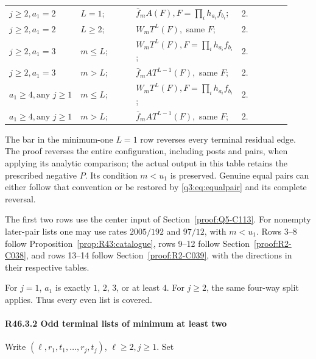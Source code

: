 \begin{longtable}{@{}p{0.2200\linewidth}p{0.2333\linewidth}p{0.2333\linewidth}p{0.2333\linewidth}@{}}
\addlinespace[2pt]
\(j\ge 2,\allowbreak a_{1}=2\) & \(L=1\); & \(\bar f_m A(F),\allowbreak  F=\prod_i h_{a_i} f_{b_i}\); & 2. \\
\addlinespace[2pt]
\(j\ge 2,\allowbreak a_{1}=2\) & \(L\ge 2\); & \(W_m T^L(F),\allowbreak \) same \(F\); & 2. \\
\addlinespace[2pt]
\(j\ge 2,\allowbreak a_{1}=3\) & \(m\le L\); & \(W_m T^L(F),\allowbreak  F=\prod_i h_{a_i} f_{b_i}\); & 2. \\
\addlinespace[2pt]
\(j\ge 2,\allowbreak a_{1}=3\) & \(m>L\); & \(\bar f_m AT^{L-1}(F),\allowbreak \) same \(F\); & 2. \\
\addlinespace[2pt]
\(a_{1}\ge 4,\allowbreak \text{any } j\ge 1\) & \(m\le L\); & \(W_m T^L(F),\allowbreak  F=\prod_i h_{a_i} f_{b_i}\); & 2. \\
\addlinespace[2pt]
\(a_{1}\ge 4,\allowbreak \text{any } j\ge 1\) & \(m>L\); & \(\bar f_m AT^{L-1}(F),\allowbreak \) same \(F\); & 2. \\
\end{longtable}
\endgroup


The bar in the minimum-one \(L=1\) row reverses every terminal residual
edge. The proof reverses the entire configuration,
including posts and pairs, when applying its analytic comparison;
the actual output in this table retains the prescribed negative \(P\).
Its condition \(m<u_{1}\) is preserved. Genuine equal pairs can either
follow that convention or be restored by \eqref{q3:eq:equalpair} and its complete reversal.

The first two rows use the center input of Section~\ref{proof:Q5-C113}.
For nonempty later-pair lists one may use rates $2005/192$ and $97/12$,
with $m<u_1$. Rows 3--8 follow Proposition~\ref{prop:R43:catalogue},
rows 9--12 follow Section~\ref{proof:R2-C038}, and rows 13--14
follow Section~\ref{proof:R2-C039}, with the directions in their
respective tables.

For \(j=1\), \(a_1\) is exactly \(1\), \(2\), \(3\), or at least \(4\). For \(j\ge2\), the same
four-way split applies. Thus every even list is covered.

\paragraph{R46.3.2 Odd terminal lists of minimum at least two}

Write \((\ell,\allowbreak r_1,\allowbreak t_1,\allowbreak \ldots,\allowbreak r_j,\allowbreak t_j)\), \(\ell\ge 2,\allowbreak  j\ge 1.\) Set

